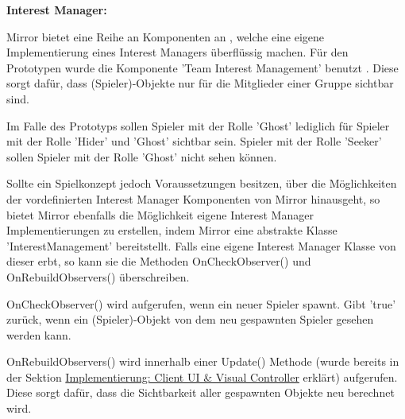 \textbf{Interest Manager:}

Mirror bietet eine Reihe an Komponenten an \cite{Wikipedia.17.02.2022}, welche eine eigene Implementierung eines Interest Managers überflüssig machen. Für den Prototypen wurde die Komponente 'Team Interest Management' benutzt \cite{Wikipedia.17.02.2022b}. Diese sorgt dafür, dass (Spieler)-Objekte nur für die Mitglieder einer Gruppe sichtbar sind. 

Im Falle des Prototyps sollen Spieler mit der Rolle 'Ghost' lediglich für Spieler mit der Rolle 'Hider' und 'Ghost' sichtbar sein. Spieler mit der Rolle 'Seeker' sollen Spieler mit der Rolle 'Ghost' nicht sehen können.

Sollte ein Spielkonzept jedoch Voraussetzungen besitzen, über die Möglichkeiten der vordefinierten Interest Manager Komponenten von Mirror hinausgeht, so bietet Mirror ebenfalls die Möglichkeit eigene Interest Manager Implementierungen zu erstellen, indem Mirror eine abstrakte Klasse 'InterestManagement' bereitstellt. Falls eine eigene Interest Manager Klasse von dieser erbt, so kann sie die Methoden OnCheckObserver() und OnRebuildObservers() überschreiben. \cite{Wikipedia.17.02.2022c}

OnCheckObserver() wird aufgerufen, wenn ein neuer Spieler spawnt. Gibt 'true' zurück, wenn ein (Spieler)-Objekt von dem neu gespawnten Spieler gesehen werden kann.

OnRebuildObservers() wird innerhalb einer Update() Methode (wurde bereits in der Sektion \hyperref[implementierung:client_UI_Controller]{Implementierung: Client UI \& Visual Controller} erklärt) aufgerufen. Diese sorgt dafür, dass die Sichtbarkeit aller gespawnten Objekte neu berechnet wird.






